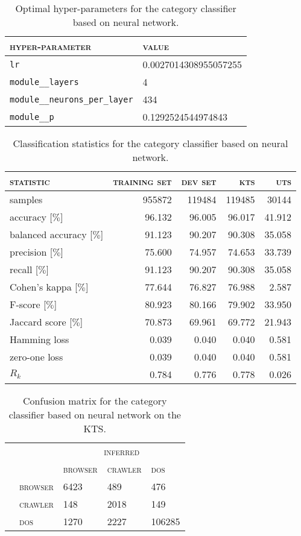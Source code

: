 \begin{table}[H]
	\centering
	\begin{tabular}{ll}
		\toprule
		\textsc{hyper-parameter} & \textsc{value}\\
		\midrule
		\verb|lr| & 0.0027014308955057255\\
		\verb|module__layers| & 4\\
		\verb|module__neurons_per_layer| & 434\\
		\verb|module__p| & 0.1292524544974843\\
		\bottomrule
	\end{tabular}
	\caption{Optimal hyper-parameters for the category classifier based on neural network.}
	\label{tab:hyperparameters_category_neural_network}
\end{table}
\begin{table}[H]
	\centering
	\begin{tabular}{lrrrr}
		\toprule
		\textsc{statistic} & \textsc{training set} & \textsc{dev set} & \textsc{kts} & \textsc{uts}\\
		\midrule
		samples & 955872 & 119484 & 119485 & 30144\\
		accuracy [$\%$] & 96.132 & 96.005 & 96.017 & 41.912\\
		balanced accuracy [$\%$] & 91.123 & 90.207 & 90.308 & 35.058\\
		precision [$\%$] & 75.600 & 74.957 & 74.653 & 33.739\\
		recall [$\%$] & 91.123 & 90.207 & 90.308 & 35.058\\
		Cohen’s kappa [$\%$] & 77.644 & 76.827 & 76.988 & 2.587\\
		F-score [$\%$] & 80.923 & 80.166 & 79.902 & 33.950\\
		Jaccard score [$\%$] & 70.873 & 69.961 & 69.772 & 21.943\\
		Hamming loss & 0.039 & 0.040 & 0.040 & 0.581\\
		zero-one loss & 0.039 & 0.040 & 0.040 & 0.581\\
		$R_k$ & 0.784 & 0.776 & 0.778 & 0.026\\
		\bottomrule
	\end{tabular}
	\caption{Classification statistics for the category classifier based on neural network.}
	\label{tab:classification_category_neural_network}
\end{table}
\begin{table}[H]
	\centering
	\begin{tabular}{ll|lll}
	\setlength{\tabcolsep}{2pt}
		 & & \multicolumn{3}{c}{\textsc{inferred}}\\
		 & & \textsc{browser} & \textsc{crawler} & \textsc{dos}\\
		\midrule
		\multirow{3}{*}{\rotatebox{90}{\textsc{target}}} & \textsc{browser} & 6423 & 489 & 476\\
		 & \textsc{crawler} & 148 & 2018 & 149\\
		 & \textsc{dos} & 1270 & 2227 & 106285\\
	\end{tabular}
	\caption{Confusion matrix for the category classifier based on neural network on the KTS.}
	\label{tab:confusion_category_neural_network}
\end{table}
